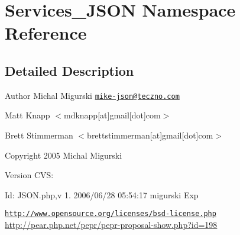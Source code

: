 \hypertarget{namespace_services___j_s_o_n}{\section{Services\-\_\-\-J\-S\-O\-N Namespace Reference}
\label{namespace_services___j_s_o_n}
}


\subsection{Detailed Description}
\begin{DoxyAuthor}{Author}
Michal Migurski \href{mailto:mike-json@teczno.com}{\tt mike-\/json@teczno.\-com} 

Matt Knapp $<$mdknapp\mbox{[}at\mbox{]}gmail\mbox{[}dot\mbox{]}com$>$ 

Brett Stimmerman $<$brettstimmerman\mbox{[}at\mbox{]}gmail\mbox{[}dot\mbox{]}com$>$ 
\end{DoxyAuthor}
\begin{DoxyCopyright}{Copyright}
2005 Michal Migurski 
\end{DoxyCopyright}
\begin{DoxyVersion}{Version}
C\-V\-S\-: 
\end{DoxyVersion}
\begin{DoxyParagraph}{Id\-:}
J\-S\-O\-N.\-php,v 1. 2006/06/28 05\-:54\-:17 migurski Exp 
\end{DoxyParagraph}
\href{http://www.opensource.org/licenses/bsd-license.php}{\tt http\-://www.\-opensource.\-org/licenses/bsd-\/license.\-php} \hyperlink{}{http\-://pear.\-php.\-net/pepr/pepr-\/proposal-\/show.\-php?id=198}